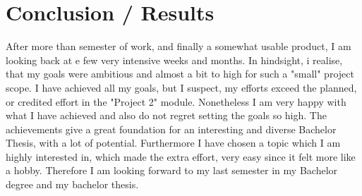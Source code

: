\chapter*{Conclusion / Results}
\label{chap:Conclusion}

After more than semester of work, and finally a somewhat usable product, I am looking back at e few very intensive weeks and months. In hindsight, i realise, that my goals were ambitious and almost a bit to high for such a "small" project scope. I have achieved all my goals, but I suspect, my efforts exceed the planned, or credited effort in the "Project 2" module. 
Nonetheless I am very happy with what I have achieved and also do not regret setting the goals so high. The achievements give a great foundation for an interesting and diverse Bachelor Thesis, with a lot of potential.
Furthermore I have chosen a topic which I am highly interested in, which made the extra effort, very easy since it felt more like a hobby. Therefore I am looking forward to my last semester in my Bachelor degree and my bachelor thesis.